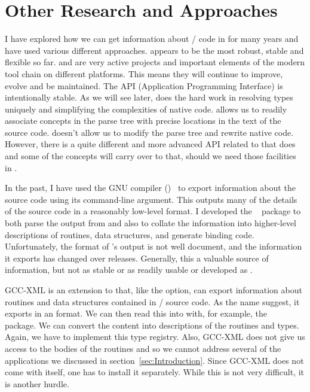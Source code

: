 \section{Other Research and Approaches}

I have explored how we can get information about \C/\Cpp{} code in
\R{} for many years and have used various different approaches.
\libclang{} appears to be the most robust, stable and flexible so far.
\clang{} and \libclang{} are very active projects and important
elements of the modern tool chain on different platforms. This means
they will continue to improve, evolve and be maintained.  The API
(Application Programming Interface) is intentionally stable.  As we
will see later, \libclang{} does the hard work in resolving types
uniquely and simplifying the complexities of native code.  \libclang{}
allows us to readily associate concepts in the parse tree with precise
locations in the text of the source code. \libclang{} doesn't allow us
to modify the parse tree and rewrite native code. However, there is a
quite different and more advanced API related to \libclang{} that does
and some of the concepts will carry over to that, should we need those
facilities in \R.

In the past, I have used the GNU compiler (\gcc)~\cite{bib:GCC} to
export information about the source code using its
 command-line argument.  This outputs
many of the details of the source code in a reasonably low-level
format. I developed the ~\cite{bib:RGCCTU}
package to both parse the output from \gcc{} and also to collate the
information into higher-level descriptions of routines, data
structures, and generate binding code.  Unfortunately, the format of
\gcc's output is not well document, and the information it exports has
changed over releases.  Generally, this a valuable source of
information, but not as stable or as readily usable or developed as
\libclang.

GCC-XML is an extension to \gcc{} that, like the
 option, can export information about
routines and data structures contained in \C/\Cpp{} source code.  As
the name suggest, it exports in an \XML{} format.  We can then read
this into \R{} with, for example, the ~\cite{bib:RSXML}
package.  We can convert the \XML{} content into descriptions of the
routines and types.  Again, we have to implement this type registry.
Also, GCC-XML does not give us access to the bodies of the routines
and so we cannot address several of the applications we discussed in
section~\ref{sec:Introduction}.  Since GCC-XML does not come with
\gcc{} itself, one has to install it separately.  While this is not
very difficult, it is another hurdle.


